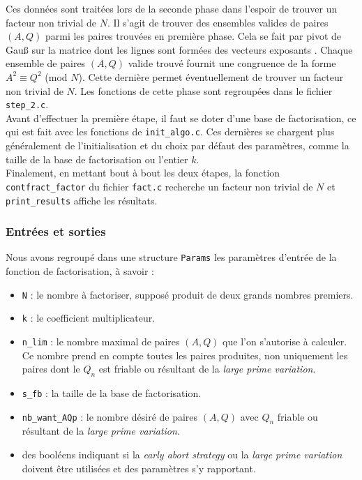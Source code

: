 Ces données sont traitées lors de la seconde phase dans l'espoir de trouver un
facteur non trivial de $N$. Il s'agit de trouver des ensembles valides de
paires $(A, Q)$ parmi les paires trouvées en première phase. Cela se fait par
pivot de Gau\ss{} sur la matrice dont les lignes sont formées des vecteurs
exposants . Chaque ensemble de paires $(A, Q)$ valide trouvé
fournit une congruence de la forme $A^2 \equiv Q^2$ (mod $N$). Cette dernière
permet éventuellement de trouver un facteur non trivial de $N$. Les fonctions de 
cette phase sont regroupées dans le fichier \texttt{step\_2.c}. \\

Avant d'effectuer la première étape, il faut se doter d'une base de factorisation,
ce qui est fait avec les fonctions de \texttt{init\_algo.c}. Ces dernières se
chargent plus généralement de l'initialisation et du choix par défaut des
paramètres, comme la taille de la base de factorisation ou l'entier $k$. \\

Finalement, en mettant bout à bout les deux étapes, la fonction 
\texttt{contfract\_factor} du fichier \texttt{fact.c} recherche un facteur
non trivial de $N$ et \texttt{print\_results} affiche les résultats. 

\subsubsection{Entrées et sorties}

Nous avons regroupé dans une structure \texttt{Params} les paramètres d'entrée
de la fonction de factorisation, à savoir :

\begin{itemize}
	\item \texttt{N} : le nombre à factoriser, supposé produit de deux grands
	nombres premiers.
    \item \texttt{k} : le coefficient multiplicateur.
	\item \texttt{n\_lim} : le nombre maximal de paires $(A,Q)$ que l'on
	s'autorise à calculer. Ce nombre prend en compte toutes les paires
	produites, non uniquement les paires dont le $Q_n$ est friable ou résultant
	de la \textit{large prime variation}.
    \item \texttt{s\_fb} : la taille de la base de factorisation. 
	\item \texttt{nb\_want\_AQp} : le nombre désiré de paires $(A,Q)$ avec
	$Q_n$ friable ou résultant de la \textit{large prime variation}.
	\item des booléens indiquant si la \textit{early abort strategy} ou la
	\textit{large prime variation} doivent être utilisées et des paramètres s'y
	rapportant.
\end{itemize}

